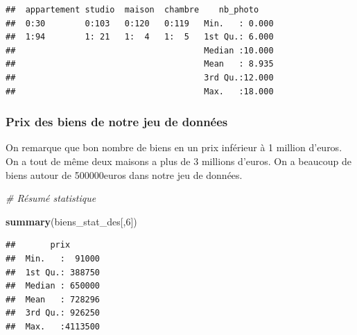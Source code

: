 \documentclass[french,]{article}
\newenvironment{Shaded}{\begin{snugshade}}{\end{snugshade}}
\newcommand{\CommentTok}[1]{\textcolor[rgb]{0.56,0.35,0.01}{\textit{#1}}}
\newcommand{\DecValTok}[1]{\textcolor[rgb]{0.00,0.00,0.81}{#1}}
\newcommand{\KeywordTok}[1]{\textcolor[rgb]{0.13,0.29,0.53}{\textbf{#1}}}
\newcommand{\NormalTok}[1]{#1}
\begin{document}
\begin{verbatim}
##  appartement studio  maison  chambre    nb_photo     
##  0:30        0:103   0:120   0:119   Min.   : 0.000  
##  1:94        1: 21   1:  4   1:  5   1st Qu.: 6.000  
##                                      Median :10.000  
##                                      Mean   : 8.935  
##                                      3rd Qu.:12.000  
##                                      Max.   :18.000
\end{verbatim}

\hypertarget{prix-des-biens-de-notre-jeu-de-donnuxe9es}{%
\subsubsection{Prix des biens de notre jeu de
données}\label{prix-des-biens-de-notre-jeu-de-donnuxe9es}}

On remarque que bon nombre de biens en un prix inférieur à 1 million
d'euros. On a tout de même deux maisons a plus de 3 millions d'euros. On
a beaucoup de biens autour de 500000euros dans notre jeu de données.

\begin{Shaded}
\begin{Highlighting}[]
\CommentTok{# Résumé statistique}

\KeywordTok{summary}\NormalTok{(biens_stat_des[,}\DecValTok{6}\NormalTok{])}
\end{Highlighting}
\end{Shaded}

\begin{verbatim}
##       prix        
##  Min.   :  91000  
##  1st Qu.: 388750  
##  Median : 650000  
##  Mean   : 728296  
##  3rd Qu.: 926250  
##  Max.   :4113500
\end{verbatim}
\end{document}

